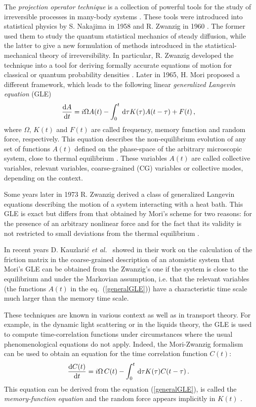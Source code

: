\documentclass[10pt,a4paper]{book}
\theoremstyle{definition}
\begin{document}
The \emph{projection operator technique} is a collection of powerful tools for the study of irreversible processes in many-body systems \cite{Grabert:Projection}. These tools were introduced into statistical physics by S. Nakajima in 1958 \cite{Nakajima1958} and R. Zwanzig in 1960 \cite{Zwanzig1960}. The former used them to study the quantum statistical mechanics of steady diffusion, while the latter to give a new formulation of methods introduced in the statistical-mechanical theory of irreversibility. In particular, R. Zwanzig developed the technique into a tool for deriving formally accurate equations of motion for classical or quantum probability densities \cite{Zwanzig1961,Zwanzig1964}. Later in 1965, H. Mori proposed a different framework, which leads to the following linear \emph{generalized Langevin equation} (GLE)
\begin{equation}\label{generalGLE}
 \frac{\mbox{d} A}{\mbox{d} t}=i\Omega A(t)-\int_0^t\,\mbox{d}\tau K(\tau)A(t-\tau)+F(t)\,,
\end{equation}
where $\Omega$, $K(t)$ and $F(t)$ are called frequency, memory function and random force, respectively.
This equation describes the non-equilibrium evolution of any set of functions $A(t)$ defined on the phase-space of the arbitrary microscopic system, close to thermal equilibrium \cite{Mori1965}. These variables $A(t)$ are called collective variables, relevant variables, coarse-grained (CG) variables or collective modes, depending on the context.

\noindent
Some years later in 1973 R. Zwanzig derived a class of generalized Langevin equations describing the motion of a system interacting with a heat bath. This GLE is exact but differs from that obtained by Mori's scheme for two reasons: for the presence of an arbitrary nonlinear force and for the fact that its validity is not restricted to small deviations from the thermal equilibrium \cite{Zwanzig1973}.

\noindent
In recent years D. Kauzlari\'c \textit{et al.}~\cite{Kauzlaric2011} showed in their work on the calculation of the friction matrix in the coarse-grained description of an atomistic system that Mori's GLE can be obtained from the Zwanzig's one if the system is close to the equilibrium and under the Markovian assumption, i.e. that the relevant variables (the functions $A(t)$ in the eq.~(\ref{generalGLE})) have a characteristic time scale much larger than the memory time scale.

These techniques are known in various context as well as in transport theory. For example, in the dynamic light scattering or in the liquids theory, the GLE is used to compute time-correlation functions under circumstances where the usual phenomenological equations do not apply. Indeed, the Mori-Zwanzig formalism can be used to obtain an equation for the time correlation function $C(t)$:  
\begin{equation}
 \frac{\mbox{d} C(t)}{\mbox{d} t}=i\Omega\, C(t)-\int_0^t\,\mbox{d}\tau K(\tau)C(t-\tau)\,.
\end{equation}
This equation can be derived from the equation (\ref{generalGLE}), is called the \emph{memory-function equation} and the random force appears implicitly in $K(t)$ \cite{Berne:DynamicLightScatt,hansen2006}.
\end{document}

